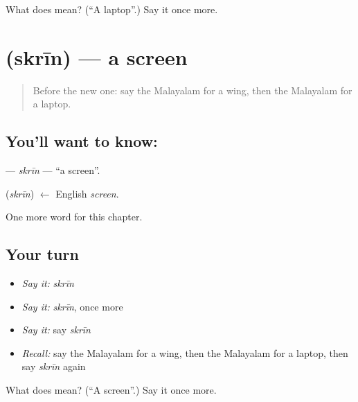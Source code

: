 \begin{tcolorbox}[breakable,colback=teal!4,colframe=teal!35!black,title={Before you move on}]
What does  mean? (\textquotedblleft{}A laptop\textquotedblright{}.) Say it once more.
\end{tcolorbox}
\section[\texorpdfstring{\ml{സ്ക്രീൻ} (skrīn)}{സ്ക്രീൻ (skrīn)}]{ (skrīn) — a screen}

\label{lesson:ML-C255-skrin}



\begin{quote}
Before the new one: say the Malayalam for a wing, then the Malayalam for a laptop.
\end{quote}

\subsection*{You'll want to know: }
\textbf{} — \emph{skrīn} — \textquotedblleft{}a screen\textquotedblright{}.

\begin{cousinweb}
\textbf{} (\emph{skrīn}) $\leftarrow$ English \emph{screen}.
\end{cousinweb}

\begin{grammarlens}[title={What you've built}]
One more word for this chapter.
\end{grammarlens}

\subsection*{Your turn}
\begin{itemize}
\raggedright
  \item \emph{Say it:} \emph{skrīn}
  \item \emph{Say it:} \emph{skrīn}, once more
  \item \emph{Say it:} say \emph{skrīn}
  \item \emph{Recall:} say the Malayalam for a wing, then the Malayalam for a laptop, then say \emph{skrīn} again
\end{itemize}

\begin{tcolorbox}[breakable,colback=teal!4,colframe=teal!35!black,title={Before you move on}]
What does  mean? (\textquotedblleft{}A screen\textquotedblright{}.) Say it once more.
\end{tcolorbox}
